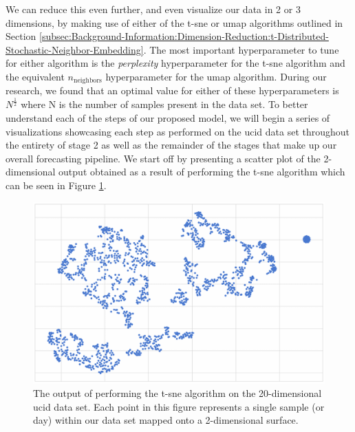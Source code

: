 \begin{adjustwidth}{-1.65cm}{-0.0cm}
\begin{enumerate}[label=Step 2.\arabic*:, leftmargin=*]
        \noindent \newline We can reduce this even further, and even visualize our data in 2 or 3 dimensions, by making use of either of the \gls{t-sne} or \gls{umap} algorithms outlined in Section \ref{subsec:Background-Information:Dimension-Reduction:t-Distributed-Stochastic-Neighbor-Embedding}. The most important hyperparameter to tune for either algorithm is the \textit{perplexity} hyperparameter for the \gls{t-sne} algorithm and the equivalent $n_{\text{neighbors}}$ hyperparameter for the \gls{umap} algorithm. During our research, we found that an optimal value for either of these hyperparameters is $N^{\frac{1}{2}}$ where N is the number of samples present in the data set. To better understand each of the steps of our proposed model, we will begin a series of visualizations showcasing each step as performed on the \gls{ucid} data set throughout the entirety of stage 2 as well as the remainder of the stages that make up our overall forecasting pipeline. We start off by presenting a scatter plot of the 2-dimensional output obtained as a result of performing the \gls{t-sne} algorithm which can be seen in Figure \ref{fig:UCID-t-SNE}.
        
        \begin{figure}[H]
            \centering
            \includegraphics[width=\textwidth]{Images/Chapter 5/Stage 2/UCID/UCID-t-SNE.pdf}
            \caption{The output of performing the \gls{t-sne} algorithm on the 20-dimensional \gls{ucid} data set. Each point in this figure represents a single sample (or day) within our data set mapped onto a 2-dimensional surface.}
            \label{fig:UCID-t-SNE}
        \end{figure}
        

\end{enumerate}
\end{adjustwidth}
